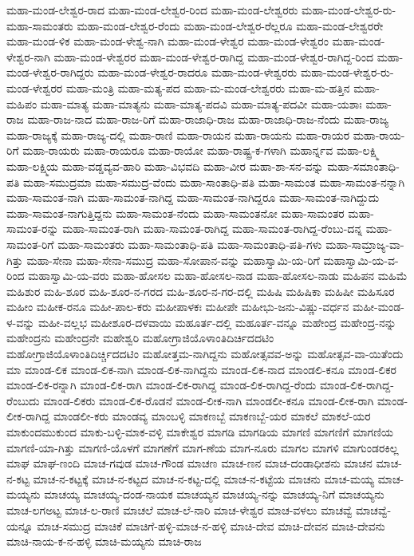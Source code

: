 {ಮಹಾ-ಮಂಡ-ಲೇಶ್ವರ-ರಾದ
ಮಹಾ-ಮಂಡ-ಲೇಶ್ವರ-ರಿಂದ
ಮಹಾ-ಮಂಡ-ಲೇಶ್ವರರು
ಮಹಾ-ಮಂಡ-ಲೇಶ್ವರ-ರು-ಮಹಾ-ಸಾಮಂತರು
ಮಹಾ-ಮಂಡ-ಲೇಶ್ವರ-ರೆಂದು
ಮಹಾ-ಮಂಡ-ಲೇಶ್ವರ-ರೆಲ್ಲರೂ
ಮಹಾ-ಮಂಡ-ಲೇಶ್ವರರೇ
ಮಹಾ-ಮಂಡ-ಳಿಕ
ಮಹಾ-ಮಂಡ-ಳೇಶ್ವ-ನಾಗಿ
ಮಹಾ-ಮಂಡ-ಳೇಶ್ವರ
ಮಹಾ-ಮಂಡ-ಳೇಶ್ವರಂ
ಮಹಾ-ಮಂಡ-ಳೇಶ್ವರ-ನಾಗಿ
ಮಹಾ-ಮಂಡ-ಳೇಶ್ವರರ
ಮಹಾ-ಮಂಡ-ಳೇಶ್ವರ-ರಾಗಿದ್ದ
ಮಹಾ-ಮಂಡ-ಳೇಶ್ವರ-ರಾಗಿದ್ದ-ರಿಂದ
ಮಹಾ-ಮಂಡ-ಳೇಶ್ವರ-ರಾಗಿದ್ದರು
ಮಹಾ-ಮಂಡ-ಳೇಶ್ವರ-ರಾದರೂ
ಮಹಾ-ಮಂಡ-ಳೇಶ್ವರರು
ಮಹಾ-ಮಂಡ-ಳೇಶ್ವರ-ರು-ಮಂಡ-ಳೇಶ್ವರರ
ಮಹಾ-ಮಂತ್ರಿ
ಮಹಾ-ಮತ್ಯ-ಪದ
ಮಹಾ-ಮ-ಮಂಡ-ಲೇಶ್ವರರು
ಮಹಾ-ಮ-ಹತ್ತಿನ
ಮಹಾ-ಮಹಿಪಂ
ಮಹಾ-ಮಾತ್ಯ
ಮಹಾ-ಮಾತ್ಯನು
ಮಹಾ-ಮಾತ್ಯ-ಪದವಿ
ಮಹಾ-ಮಾತ್ಯ-ಪದವೀ
ಮಹಾ-ಯಶಾಃ
ಮಹಾ-ರಾಜ
ಮಹಾ-ರಾಜ-ನಾದ
ಮಹಾ-ರಾಜ-ರಿಗೆ
ಮಹಾ-ರಾಜಾಧಿ-ರಾಜ
ಮಹಾ-ರಾಜಾಧಿ-ರಾಜ-ನೆಂದು
ಮಹಾ-ರಾಜ್ಯ
ಮಹಾ-ರಾಜ್ಯಕ್ಕೆ
ಮಹಾ-ರಾಜ್ಯ-ದಲ್ಲಿ
ಮಹಾ-ರಾಣಿ
ಮಹಾ-ರಾಯನ
ಮಹಾ-ರಾಯನು
ಮಹಾ-ರಾಯರ
ಮಹಾ-ರಾಯ-ರಿಗೆ
ಮಹಾ-ರಾಯರು
ಮಹಾ-ರಾಯರೂ
ಮಹಾ-ರಾಯೋ
ಮಹಾ-ರಾಷ್ಟ್ರ-ಕ-ಗಳಾಗಿ
ಮಹಾರ್ನ್ನವ
ಮಹಾ-ಲಕ್ಷ್ಮಿ
ಮಹಾ-ಲಕ್ಷ್ಮಿಯ
ಮಹಾ-ವಡ್ಡವ್ಯವ-ಹಾರಿ
ಮಹಾ-ವಿಭವದಿ
ಮಹಾ-ವೀರ
ಮಹಾ-ಶಾ-ಸನ-ವನ್ನು
ಮಹಾ-ಸಮಾಂತಾಧಿ-ಪತಿ
ಮಹಾ-ಸಮುದ್ರಮಾ
ಮಹಾ-ಸಮುದ್ರ-ವೆಂದು
ಮಹಾ-ಸಾಂತಾಧಿ-ಪತಿ
ಮಹಾ-ಸಾಮಂತ
ಮಹಾ-ಸಾಮಂತ-ನನ್ನಾಗಿ
ಮಹಾ-ಸಾಮಂತ-ನಾಗಿ
ಮಹಾ-ಸಾಮಂತ-ನಾಗಿದ್ದ
ಮಹಾ-ಸಾಮಂತ-ನಾಗಿದ್ದರೂ
ಮಹಾ-ಸಾಮಂತ-ನಾಗಿದ್ದುದು
ಮಹಾ-ಸಾಮಂತ-ನಾಗುತ್ತಿದ್ದನು
ಮಹಾ-ಸಾಮಂತ-ನೆಂದು
ಮಹಾ-ಸಾಮಂತನೋ
ಮಹಾ-ಸಾಮಂತರ
ಮಹಾ-ಸಾಮಂತ-ರನ್ನು
ಮಹಾ-ಸಾಮಂತ-ರಾಗಿ
ಮಹಾ-ಸಾಮಂತ-ರಾಗಿದ್ದ
ಮಹಾ-ಸಾಮಂತ-ರಾಗಿದ್ದ-ರೆಂಬು-ದನ್ನ
ಮಹಾ-ಸಾಮಂತ-ರಿಗೆ
ಮಹಾ-ಸಾಮಂತರು
ಮಹಾ-ಸಾಮಂತಾಧಿ-ಪತಿ
ಮಹಾ-ಸಾಮಂತಾಧಿ-ಪತಿ-ಗಳು
ಮಹಾ-ಸಾಮ್ರಾಜ್ಯ-ವಾ-ಗಿತ್ತು
ಮಹಾ-ಸೇನಾ
ಮಹಾ-ಸೇನಾ-ಸಮುದ್ರ
ಮಹಾ-ಸೋಪಾನ-ವನ್ನು
ಮಹಾಸ್ವಾಮಿ-ಯ-ರಿಗೆ
ಮಹಾಸ್ವಾಮಿ-ಯ-ವ-ರಿಂದ
ಮಹಾಸ್ವಾಮಿ-ಯ-ವರು
ಮಹಾ-ಹೋಸಲ
ಮಹಾ-ಹೋಸಲ-ನಾಡ
ಮಹಾ-ಹೋಸಲ-ನಾಡು
ಮಹಿಪನ
ಮಹಿಮೆ
ಮಹಿಶುರ
ಮಹಿ-ಶೂರ
ಮಹಿ-ಶೂರ-ನ-ಗರದ
ಮಹಿ-ಶೂರ-ನ-ಗರ-ದಲ್ಲಿ
ಮಹಿಷಿ
ಮಹಿಷಿಕಾ
ಮಹಿಷೀ
ಮಹಿಸೂರ
ಮಹೀಂ
ಮಹೀಕ-ರನೂ
ಮಹೀ-ಪಾಲ-ಕರು
ಮಹೀಪಾಳಕಃ
ಮಹೀಪೇ
ಮಹೀಭು-ಜನು-ವಿಷ್ಣು-ವರ್ಧನ
ಮಹೀ-ಮಂಡ-ಳ-ವನ್ನು
ಮಹೀ-ವಲ್ಲಭ
ಮಹೀಶೂರ-ದಳವಾಯಿ
ಮಹೂರ್ತ-ದಲ್ಲಿ
ಮಹೂರ್ತ-ವನ್ನೂ
ಮಹೇಂದ್ರ
ಮಹೇಂದ್ರ-ನನ್ನು
ಮಹೇಂದ್ರನು
ಮಹೇಂದ್ರನೇ
ಮಹೇಶ್ವರಿ
ಮಹೋಗ್ರಾಜಿಯೊಳಾಂತಿದಿರ್ಚಿದದಟಿಂ
ಮಹೋಗ್ರಾಜಿಯೊಳಾಂತಿದಿರ್ಚ್ಚಿದದಟಿಂ
ಮಹೋತ್ತಮ-ನಾಗಿದ್ದನು
ಮಹೋತ್ಸವವ-ಅನ್ನು
ಮಹೋತ್ಸವ-ವಾ-ಯಿತೆಂದು
ಮಾ
ಮಾಂಡ-ಲಿಕ
ಮಾಂಡ-ಲಿಕ-ನಾಗಿ
ಮಾಂಡ-ಲಿಕ-ನಾಗಿದ್ದನು
ಮಾಂಡ-ಲಿಕ-ನಾದ
ಮಾಂಡಲಿ-ಕನೂ
ಮಾಂಡ-ಲಿಕರ
ಮಾಂಡ-ಲಿಕ-ರನ್ನಾಗಿ
ಮಾಂಡ-ಲಿಕ-ರಾಗಿ
ಮಾಂಡ-ಲಿಕ-ರಾಗಿದ್ದ
ಮಾಂಡ-ಲಿಕ-ರಾಗಿದ್ದ-ರೆಂದು
ಮಾಂಡ-ಲಿಕ-ರಾಗಿದ್ದ-ರೆಂಬುದು
ಮಾಂಡ-ಲಿಕರು
ಮಾಂಡ-ಲಿಕ-ರೊಡನೆ
ಮಾಂಡ-ಲೀಕ-ನಾಗಿ
ಮಾಂಡಲೀ-ಕನೂ
ಮಾಂಡ-ಲೀಕ-ರಾಗಿ
ಮಾಂಡ-ಲೀಕ-ರಾಗಿದ್ದ
ಮಾಂಡಲೀ-ಕರು
ಮಾಂಡವ್ಯ
ಮಾಂಬಳ್ಳಿ
ಮಾಕಣಬ್ಬೆ
ಮಾಕಣಬ್ಬೆ-ಯರ
ಮಾಕಲೆ
ಮಾಕಲೆ-ಯರ
ಮಾಕುಂದಮುಕುಂದ
ಮಾಕು-ಬಳ್ಳಿ-ಮಾಕ-ವಳ್ಳಿ
ಮಾಕೇಶ್ವರ
ಮಾಗಡಿ
ಮಾಗಡಿಯ
ಮಾಗಣಿ
ಮಾಗಣಿಗೆ
ಮಾಗಣಿಯ
ಮಾಗಣಿ-ಯಾ-ಗಿತ್ತು
ಮಾಗಣಿ-ಯೊಳಗೆ
ಮಾಗಣೆಗೆ
ಮಾಗ-ಣೆಯ
ಮಾಗ-ನೂರು
ಮಾಗಲ
ಮಾಗಳಿ
ಮಾಗುಂಡರಕಿಲ್ಲ
ಮಾಘ
ಮಾಘ-ಣಂದಿ
ಮಾಚ-ಗವುಡ
ಮಾಚ-ಗೌಂಡ
ಮಾಚಣ
ಮಾಚ-ಣನ
ಮಾಚ-ದಂಡಾಧೀಶನು
ಮಾಚನ
ಮಾಚ-ನ-ಕಟ್ಟ
ಮಾಚ-ನ-ಕಟ್ಟಕ್ಕೆ
ಮಾಚ-ನ-ಕಟ್ಟದ
ಮಾಚ-ನ-ಕಟ್ಟ-ದಲ್ಲಿ
ಮಾಚ-ನ-ಕಟ್ಟೆಯ
ಮಾಚನು
ಮಾಚ-ಮಯ್ಯ
ಮಾಚ-ಮಯ್ಯನು
ಮಾಚಯ್ಯ
ಮಾಚಯ್ಯ-ದಂಡ-ನಾಯಕ
ಮಾಚಯ್ಯನ
ಮಾಚಯ್ಯ-ನನ್ನು
ಮಾಚಯ್ಯ-ನಿಗೆ
ಮಾಚಯ್ಯನು
ಮಾಚ-ಲಗಅಟ್ಟ
ಮಾಚ-ಲ-ರಾಣಿ
ಮಾಚಲೆ
ಮಾಚ-ಲೆ-ನಾರಿ
ಮಾಚ-ಳೇಶ್ವರ
ಮಾಚ-ವಳಲು
ಮಾಚವ್ವೆ
ಮಾಚವ್ವೆ-ಯನ್ನೂ
ಮಾಚ-ಸಮುದ್ರ
ಮಾಚಿಕೆ
ಮಾಚಿಗೆ-ಹಳ್ಳಿ-ಮಾಚ-ನ-ಹಳ್ಳಿ
ಮಾಚಿ-ದೇವ
ಮಾಚಿ-ದೇವನ
ಮಾಚಿ-ದೇವನು
ಮಾಚಿ-ನಾಯ-ಕ-ನ-ಹಳ್ಳಿ
ಮಾಚಿ-ಮಯ್ಯನು
ಮಾಚಿ-ರಾಜ
}
